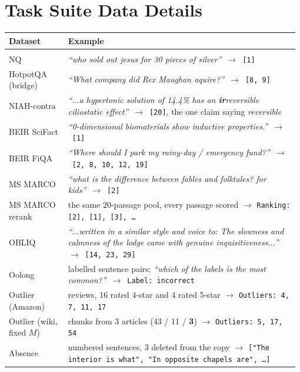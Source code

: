 \section{Task Suite Data Details}
\label{app:data-details}


\providecommand{\ctc}[1]{\ensuremath{\mathcal{O}_T(#1)}}
\providecommand{\ex}[2]{#1~$\rightarrow$~\texttt{#2}}
\providecommand{\exblk}[1]{\multicolumn{2}{@{}l}{#1} \\}

\begin{table}[t]
\centering
\scriptsize
\setlength{\tabcolsep}{4pt}
\renewcommand{\arraystretch}{1.12}

\begin{tabular}{@{}
  >{\raggedright\arraybackslash}p{0.20\linewidth}
  >{\raggedright\arraybackslash}p{0.78\linewidth}
@{}}
\toprule
\textbf{Dataset} & \textbf{Example} \\
\midrule
\exblk{\textbf{\(\mathbf{O}(N)\): One-pass tasks}}
\midrule

NQ
  & \ex{\emph{``who sold out jesus for 30 pieces of silver''}}{[1]} \\
HotpotQA (bridge)
  & \ex{\emph{``What company did Rex Maughan aquire?''}}{[8, 9]} \\
NIAH-contra
  & \ex{\emph{``$\dots$a hypertonic solution of 14.4\% has an \textbf{ir}reversible ciliostatic
    effect''}}{[20]}, the one claim saying \emph{reversible} \\
BEIR SciFact
  & \ex{\emph{``0-dimensional biomaterials show inductive properties.''}}{[1]} \\
BEIR FiQA
  & \ex{\emph{``Where should I park my rainy-day / emergency fund?''}}{[2, 8, 10, 12, 19]} \\
MS MARCO
  & \ex{\emph{``what is the difference between fables and folktales? for kids''}}{[2]} \\
MS MARCO rerank
  & the same 20-passage pool, every passage scored $\rightarrow$
    \texttt{Ranking: [2], [1], [3], \dots} \\
OBLIQ
  & \ex{\emph{``$\dots$written in a similar style and voice to: The slowness and calmness of the
    lodge came with genuine inquisitiveness$\dots$''}}{[14, 23, 29]} \\
Oolong
  & 10 labelled sentence pairs; \ex{\emph{``which of the labels is the most
    common?''}}{Label: incorrect} \\
Outlier (Amazon)
  & 20 reviews, 16 rated 4-star and 4 rated 5-star $\rightarrow$ \texttt{Outliers: 4, 7, 11, 17} \\
Outlier (wiki, fixed \(M\))
  & 57 chunks from 3 articles (43 / 11 / \textbf{3}) $\rightarrow$ \texttt{Outliers: 5, 17, 54} \\
Absence
  & 90 numbered sentences, 3 deleted from the copy $\rightarrow$ \texttt{["The interior is what",
    "In opposite chapels are", \dots]} \\


\end{tabular}
\end{table}
